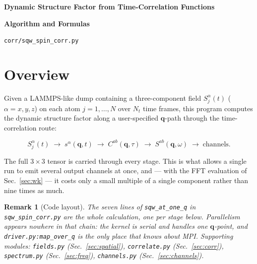 \documentclass[12pt, a4paper, oneside]{article}
\newtheorem{remark}[theorem]{Remark}
\newcommand{\qvec}{\mathbf{q}}
\newcommand{\Nt}{N_t}
\newcommand{\Na}{N}
\newcommand{\field}{S}
\begin{document}
\thispagestyle{empty}
\vspace*{\fill}
\begin{center}
    \Huge\textbf{Dynamic Structure Factor from Time-Correlation Functions}

    \vspace{1cm}
    \Large\textbf{Algorithm and Formulas}

    \vspace{0.8cm}
    \large \texttt{corr/sqw\_spin\_corr.py}
\end{center}
\vspace*{\fill}

\newpage
\tableofcontents
\newpage

\section{Overview}

Given a LAMMPS-like dump containing a three-component field $\field_j^\alpha(t)$
($\alpha = x,y,z$) on each atom $j = 1,\dots,\Na$ over $\Nt$ time frames, this
program computes the dynamic structure factor along a user-specified
$\qvec$-path through the time-correlation route:

\begin{equation}
    \field_j^\alpha(t) \;\longrightarrow\; s^\alpha(\qvec,t)
    \;\longrightarrow\; C^{ab}(\qvec,\tau)
    \;\longrightarrow\; S^{ab}(\qvec,\omega)
    \;\longrightarrow\; \text{channels}.
\end{equation}

The full $3\times3$ tensor is carried through every stage. This is what allows
a single run to emit several output channels at once, and --- with the FFT
evaluation of Sec.~\ref{sec:wk} --- it costs only a small multiple of a single
component rather than nine times as much.

\begin{remark}[Code layout]
The seven lines of \texttt{sqw\_at\_one\_q} in \texttt{sqw\_spin\_corr.py} are
the whole calculation, one per stage below. Parallelism appears nowhere in that
chain: the kernel is serial and handles one $\qvec$-point, and
\texttt{driver.py:map\_over\_q} is the only place that knows about MPI.
Supporting modules: \texttt{fields.py} (Sec.~\ref{sec:spatial}),
\texttt{correlate.py} (Sec.~\ref{sec:corr}), \texttt{spectrum.py}
(Sec.~\ref{sec:freq}), \texttt{channels.py} (Sec.~\ref{sec:channels}).
\end{remark}
\end{document}
